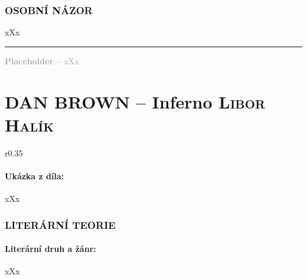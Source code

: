 \documentclass[A4paper]{extarticle} %
\begin{document}


\section*{OSOBNÍ NÁZOR}
\noindent 
xXx

\vfill

\noindent\begin{minipage}{\textwidth}
    \textcolor{darkgray}{\rule{\linewidth}{0.4pt}
    \footnotesize
    \textbf{Placeholder --} xXx
    }
\end{minipage}


\newpage


\changefontsize{8pt}

\part*{DAN BROWN -- Inferno {\hfill \normalfont\tiny\textsc{Libor Halík}}}

\noindent\begin{wrapfigure}{r}{0.35\textwidth}
\tiny

\subsection*{Ukázka z díla:}
\setlength{\parindent}{3pt}
xXx
\end{wrapfigure}

\section*{LITERÁRNÍ TEORIE}

\subsection*{Literární druh a žánr:}
\noindent xXx

\end{document}
